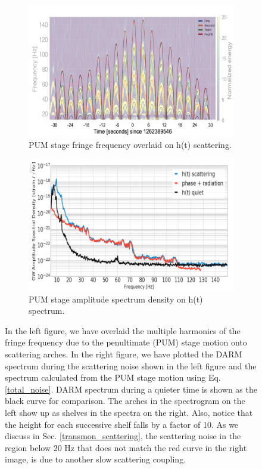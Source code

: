 \documentclass[12pt]{iopart}
\begin{document}
\begin{figure}[h]
\captionsetup[subfigure]{font=scriptsize,labelfont=scriptsize}
   \centering
    \begin{subfigure}[b]{0.45\textwidth}
        \centering
         \includegraphics[width= \textwidth]{fringe_l2c.png}
         \caption{PUM stage fringe frequency overlaid on h(t) scattering.}
         \label{fig:fringel2}
    \end{subfigure}
    \hfill
    \begin{subfigure}[b]{0.44\textwidth}
        \centering
         \includegraphics[width =\textwidth]{spectrum_l2new3.png}
         \caption{PUM stage amplitude spectrum density on h(t) spectrum.}
         \label{fig:spectruml2}
         
    
    \end{subfigure}
    \caption{In the left figure, we have overlaid the multiple harmonics of the fringe frequency due to the penultimate (PUM) stage motion onto scattering arches. In the right figure, we have plotted the DARM spectrum during the scattering noise shown in the left figure and the spectrum calculated from the PUM stage motion using Eq. \ref{total_noise}. DARM spectrum during a quieter time is shown as the black curve for comparison. The arches in the spectrogram on the left show up as shelves in the spectra on the right. Also, notice that the height for each successive shelf falls by a factor of 10. As we discuss in Sec. \ref{transmon_scattering}, the scattering noise in the region below 20 Hz that does not match the red curve in the right image, is due to another slow scattering coupling.}
    \label{fig:fringespectrum}
    

\end{figure}
\end{document}
